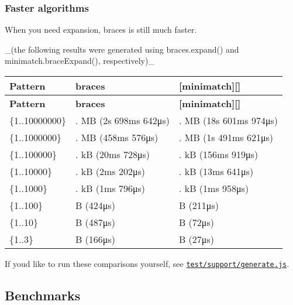 \subsubsection*{Faster algorithms}

When you need expansion, braces is still much faster.

\+\_\+(the following results were generated using {\ttfamily braces.\+expand()} and {\ttfamily minimatch.\+brace\+Expand()}, respectively)\+\_\+

\tabulinesep=1mm
\begin{longtabu} spread 0pt [c]{*{3}{|X[-1]}|}
\hline
\rowcolor{\tableheadbgcolor}\textbf{ {\bfseries Pattern}  }&\textbf{ {\bfseries braces}  }&\textbf{ {\bfseries \mbox{[}minimatch\mbox{]}\mbox{[}\mbox{]}}   }\\
\endfirsthead
\hline
\endfoot
\hline
\rowcolor{\tableheadbgcolor}\textbf{ {\bfseries Pattern}  }&\textbf{ {\bfseries braces}  }&\textbf{ {\bfseries \mbox{[}minimatch\mbox{]}\mbox{[}\mbox{]}}   }\\
\endhead
{\ttfamily \{1..10000000\}}  &{. MB} (2s 698ms 642μs)  &{. MB} (18s 601ms 974μs)   \\
{\ttfamily \{1..1000000\}}  &{. MB} (458ms 576μs)  &{. MB} (1s 491ms 621μs)   \\
{\ttfamily \{1..100000\}}  &{. kB} (20ms 728μs)  &{. kB} (156ms 919μs)   \\
{\ttfamily \{1..10000\}}  &{. kB} (2ms 202μs)  &{. kB} (13ms 641μs)   \\
{\ttfamily \{1..1000\}}  &{. kB} (1ms 796μs)  &{. kB} (1ms 958μs)   \\
{\ttfamily \{1..100\}}  &{ B} (424μs)  &{ B} (211μs)   \\
{\ttfamily \{1..10\}}  &{ B} (487μs)  &{ B} (72μs)   \\
{\ttfamily \{1..3\}}  &{ B} (166μs)  &{ B} (27μs)   \\
\end{longtabu}


If you\textquotesingle{}d like to run these comparisons yourself, see \href{test/support/generate.js}{\tt test/support/generate.\+js}.

\subsection*{Benchmarks}

